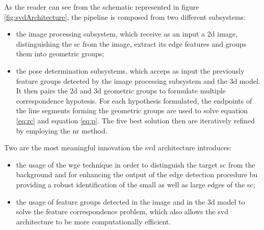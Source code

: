 As the reader can see from the schematic represented in figure \ref{fig:svdArchitecture}, the pipeline is composed from two different subsystems:
\begin{itemize}
  \item the image processing subsystem, which receive as an input a \acrshort{2d} image, distinguishing the \acrshort{sc} from the image, extract its edge features and groups them into geometric groups;
  \item the pose determination subsystems, which acceps as input the previously feature groups detected by the image processing subsystem and the \acrshort{3d} model. It then pairs the \acrshort{2d} and \acrshort{3d} geometric groups to formulate multiple correspondence hypotesis. For each hypothesis formulated, the endpoints of the line segments forming the geometric groups are used to solve equation \eqref{eq:rc} and equation \eqref{eq:p}. The five best solution then are iteratively refined by employing the \acrshort{nr} method.
\end{itemize}

Two are the most meaningful innovation the \acrshort{svd} architecture introduces:
\begin{itemize}
  \item the usage of the \acrshort{wge} technique in order to distinguish the target \acrshort{sc} from the background and for enhancing the output of the edge detection procedure bu providing a robust identification of the small as well as large edges of the \acrshort{sc};
  \item the usage of feature groups detected in the image and in the \acrshort{3d} model to solve the feature correspondence problem, which also allows the \acrshort{svd} architecture to be more computationally efficient.
\end{itemize}


